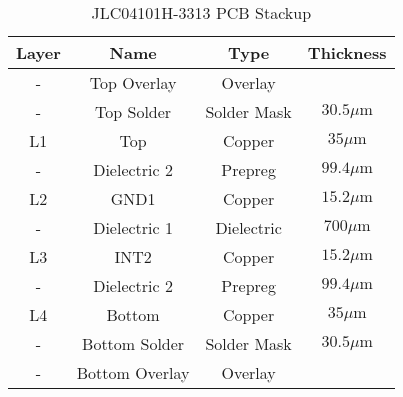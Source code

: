 \begin{table}[!hbt]
    \centering
    \begin{tabular}{| c || c | c | c |}
    \hline
    Layer &  Name & Type & Thickness\\
    \hline
    \hline
    - & Top Overlay & Overlay & \\
    - & Top Solder & Solder Mask & $30.5 \si{\mu\meter}$ \\
    L1 & Top & Copper & $35 \si{\mu\meter}$ \\
    - & Dielectric 2 & Prepreg & $99.4 \si{\mu\meter}$ \\
    L2 & GND1 & Copper & $15.2 \si{\mu\meter}$ \\
    - & Dielectric 1 & Dielectric & $700 \si{\mu\meter}$ \\
    L3 & INT2 & Copper & $15.2 \si{\mu\meter}$ \\
    - & Dielectric 2 & Prepreg & $99.4 \si{\mu\meter}$ \\
    L4 & Bottom & Copper & $35 \si{\mu\meter}$ \\
    - & Bottom Solder & Solder Mask & $30.5 \si{\mu\meter}$ \\
    - & Bottom Overlay & Overlay & \\
    \hline
    \end{tabular}
    \caption{JLC04101H-3313 PCB Stackup}
    \label{tab:stackup}
\end{table}
\FloatBarrier